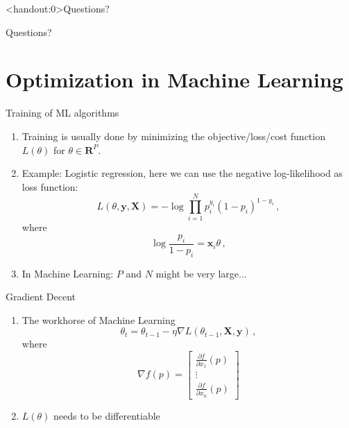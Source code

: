 \documentclass[10pt]{beamer}
\begin{document}
\begin{frame}<handout:0>{Questions?}

Questions?

\end{frame}



\section{Optimization in Machine Learning}
\frame{\sectionpage}

\begin{frame}{Training of ML algorithms}

\begin{enumerate}
\item Training is usually done by minimizing the objective/loss/cost function $L(\theta)$ for $\theta \in \mathbf{R}^P$.
\item Example: Logistic regression, here we can use the {\color{uured} negative} log-likelihood as loss function:
\[
L(\theta, \mathbf{y}, \mathbf{X}) = - \log \prod^N_{i=1} p_i^{y_i} (1 - p_i)^{1-y_i} \,,
\]
where
\[
\log \frac{p_i}{1-p_i} = \mathbf{x}_i \theta  \,,
\]\pause
\item In Machine Learning: $P$ and $N$ might be very large...
\end{enumerate}


\end{frame}



\begin{frame}{Gradient Decent}

\begin{enumerate}
\item The workhorse of Machine Learning
\[
\theta_t = \theta_{t-1} - \eta \nabla L(\theta_{t-1}, \mathbf{X}, \mathbf{y})\,,
\]
where
\[
\nabla f(p)=\begin{bmatrix}{\frac {\partial f}{\partial x_{1}}}(p)\\\vdots \\{\frac {\partial f}{\partial x_{n}}}(p)\end{bmatrix}
\]
\item $L(\theta)$ needs to be differentiable
\end{enumerate}

\end{frame}
\end{document}
